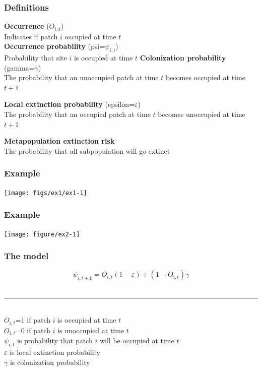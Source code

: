 \documentclass[color=usenames,dvipsnames]{beamer}\usepackage[]{graphicx}\usepackage[]{color}
\newenvironment{knitrout}{}{} %
\begin{document}
\begin{frame}
  \frametitle{Definitions}
  {\bf Occurrence} ($O_{i,t}$) \\
  Indicates if patch $i$ occupied at time $t$  \\
  \pause
  \vfill
  {\bf Occurrence probability} (psi=$\psi_{i,t}$) \\
  Probability that site $i$ is occupied at time $t$
  \pause
  \vfill
  {\bf Colonization probability} (gamma=$\gamma$) \\
  The probability that an unoccupied patch at time $t$ becomes occupied
  at time $t+1$ \par
  \pause
  \vfill
  {\bf Local extinction probability} (epsilon=$\varepsilon$) \\
  The probability that an occupied patch at time $t$ becomes
  unoccupied at time $t+1$ \par
  \pause
  \vfill
  {\bf Metapopulation extinction risk} \\
  The probability that all subpopulation will go extinct
\end{frame}




\begin{frame}[fragile]
  \frametitle{Example}
  \vspace{-1cm}

\texttt{[image: figs/ex1/ex1-1]}
\end{frame}



\begin{frame}[fragile]
  \frametitle{Example}
\begin{knitrout}
\color{fgcolor}

\texttt{[image: figure/ex2-1]} \hfill{}



\end{knitrout}
\end{frame}







\begin{frame}
  \frametitle{The model}
  \[
    \psi_{i,t+1} = O_{i,t}(1-\varepsilon) + (1-O_{i,t})\gamma
  \]
   \\
  \vspace{0.5cm}
  \rule{0.5\textwidth}{1pt} \\
  $O_{i,t}$=1 if patch $i$ is occupied at time $t$ \\
  $O_{i,t}$=0 if patch $i$ is unoccupied at time $t$ \\
  $\psi_{i,t}$ is probability that patch $i$ will be occupied at time
  $t$ \\
  $\varepsilon$ is local extinction probability \\
  $\gamma$ is colonization probability
\end{frame}
\end{document}
